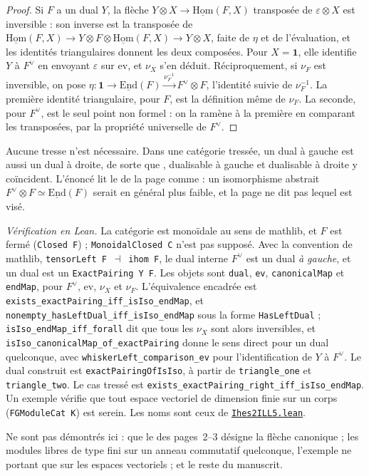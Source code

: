 \begin{proof}
Si $F$ a un dual $Y$, la flèche $Y \otimes X \to \underline{\mathrm{Hom}}(F, X)$ transposée de $\varepsilon \otimes X$ est inversible : son inverse est la transposée de $\underline{\mathrm{Hom}}(F,X) \to Y \otimes F \otimes \underline{\mathrm{Hom}}(F,X) \to Y \otimes X$, faite de $\eta$ et de l'évaluation, et les identités triangulaires donnent les deux composées. Pour $X = \mathbf 1$, elle identifie $Y$ à $F^\vee$ en envoyant $\varepsilon$ sur $\mathrm{ev}$, et $\nu_X$ s'en déduit. Réciproquement, si $\nu_F$ est inversible, on pose $\eta : \mathbf 1 \to \underline{\mathrm{End}}(F) \xrightarrow{\nu_F^{-1}} F^\vee \otimes F$, l'identité suivie de $\nu_F^{-1}$. La première identité triangulaire, pour $F$, est la définition même de $\nu_F$. La seconde, pour $F^\vee$, est le seul point non formel : on la ramène à la première en comparant les transposées, par la propriété universelle de $F^\vee$.
\end{proof}

\noindent Aucune tresse n'est nécessaire. Dans une catégorie tressée, un dual à gauche est aussi un dual à droite, de sorte que , dualisable à gauche et dualisable à droite y coïncident. L'énoncé lit le \q{$\simeq$} de la page comme  : un isomorphisme abstrait $F^\vee \otimes F \simeq \underline{\mathrm{End}}(F)$ serait en général plus faible, et la page ne dit pas lequel est visé.

\noindent\emph{Vérification en Lean.} La catégorie est monoïdale au sens de mathlib, et $F$ est fermé (\texttt{Closed F}) ; \texttt{MonoidalClosed C} n'est pas supposé. Avec la convention de mathlib, \texttt{tensorLeft F}~$\dashv$~\texttt{ihom F}, le dual interne $F^\vee$ est un dual \emph{à gauche}, et un dual est un \texttt{ExactPairing Y F}. Les objets sont \texttt{dual}, \texttt{ev}, \texttt{canonicalMap} et \texttt{endMap}, pour $F^\vee$, $\mathrm{ev}$, $\nu_X$ et $\nu_F$. L'équivalence encadrée est \texttt{exists\_exactPairing\_iff\_isIso\_endMap}, et \texttt{nonempty\_hasLeftDual\_iff\_isIso\_endMap} sous la forme \texttt{HasLeftDual} ; \texttt{isIso\_endMap\_iff\_forall} dit que tous les $\nu_X$ sont alors inversibles, et \texttt{isIso\_canonicalMap\_of\_exactPairing} donne le sens direct pour un dual quelconque, avec \texttt{whiskerLeft\_comparison\_ev} pour l'identification de $Y$ à $F^\vee$. Le dual construit est \texttt{exactPairingOfIsIso}, à partir de \texttt{triangle\_one} et \texttt{triangle\_two}. Le cas tressé est \texttt{exists\_exactPairing\_right\_iff\_isIso\_endMap}. Un exemple vérifie que tout espace vectoriel de dimension finie sur un corps (\texttt{FGModuleCat K}) est serein. Les noms sont ceux de \href{\leanblobmain/CategoryTheory/Ihes2ILL5.lean}{\texttt{Ihes2ILL5.\allowbreak{}lean}}.

Ne sont pas démontrés ici : que le \q{$\simeq$} des pages~2--3 désigne la flèche canonique ; les modules libres de type fini sur un anneau commutatif quelconque, l'exemple ne portant que sur les espaces vectoriels ; et le reste du manuscrit.
